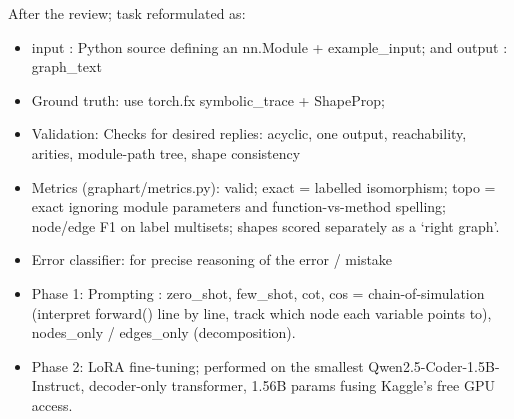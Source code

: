 \documentclass[twoside,english]{article}
\newcommand{\R}{\mathbb{R}}
\begin{document}
After the review; task reformulated as: 
\begin{itemize}
	\item input : Python source defining an nn.Module + example\_input; and output : graph\_text
	\item Ground truth: use torch.fx symbolic\_trace + ShapeProp; 
	\item Validation: Checks for desired replies: acyclic, one output, reachability, arities,
	module-path tree, shape consistency
	\item Metrics (graphart/metrics.py): valid; exact = labelled isomorphism; 
	topo = exact ignoring module parameters and function-vs-method spelling;
	node/edge F1 on label multisets; shapes scored separately as a `right graph'.
	\item Error classifier: for precise reasoning of the error / mistake
	\item Phase 1: Prompting : zero\_shot, few\_shot, cot, cos = chain-of-simulation (interpret forward() line by line,
	track which node each variable points to), nodes\_only / edges\_only (decomposition).
	\item Phase 2: LoRA fine-tuning; performed on the smallest Qwen2.5-Coder-1.5B-Instruct,  
	decoder-only transformer, 1.56B params fusing Kaggle's free GPU access.
\end{itemize}

\end{document}
